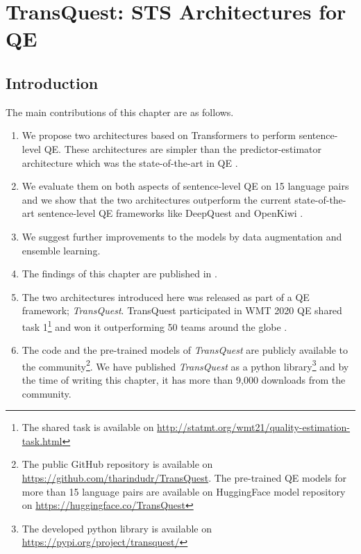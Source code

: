 \chapter{\label{cha:qe_transquest}TransQuest: STS Architectures for QE}

\section{Introduction}
\cite{conneau-etal-2020-unsupervised} 

The main contributions of this chapter are as follows.
\begin{enumerate}
	\item We propose two architectures based on Transformers to perform sentence-level QE. These architectures are simpler than the predictor-estimator architecture which was the state-of-the-art in QE \cite{lee-2020-two, wang-etal-2018-alibaba}. 
	
	\item We evaluate them on both aspects of sentence-level QE on 15 language pairs and we show that the two architectures outperform the current state-of-the-art sentence-level QE frameworks like DeepQuest \cite{ive-etal-2018-deepquest} and OpenKiwi \cite{kepler-etal-2019-openkiwi}.
	
	\item We suggest further improvements to the models by data augmentation and ensemble learning.
	
	\item The findings of this chapter are published in \citet{ranasinghe-etal-2020-transquest}. 
	
	\item The two architectures introduced here was released as part of a QE framework; \textit{TransQuest}. TransQuest participated in WMT 2020 QE shared task 1\footnote{The shared task is available on \url{http://statmt.org/wmt21/quality-estimation-task.html}} \cite{specia-etal-2020-findings-wmt} and won it outperforming 50 teams around the globe \cite{ranasinghe-etal-2020-transquest-wmt2020}.
	
	\item The code and the pre-trained models of \textit{TransQuest} are publicly available to the community\footnote{The public GitHub repository is available on \url{https://github.com/tharindudr/TransQuest}. The pre-trained QE models for more than 15 language pairs are available on HuggingFace model repository on \url{https://huggingface.co/TransQuest}}. We have published \textit{TransQuest} as a python library\footnote{The developed python library is available on \url{https://pypi.org/project/transquest/}} and by the time of writing this chapter, it has more than 9,000 downloads from the community. 
	
\end{enumerate}

